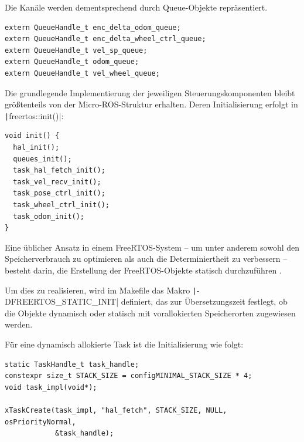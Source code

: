 Die Kanäle werden dementsprechend durch Queue-Objekte repräsentiert.

\begin{code}
\begin{verbatim}
extern QueueHandle_t enc_delta_odom_queue;
extern QueueHandle_t enc_delta_wheel_ctrl_queue;
extern QueueHandle_t vel_sp_queue;
extern QueueHandle_t odom_queue;
extern QueueHandle_t vel_wheel_queue;
\end{verbatim}
\end{code}

Die grundlegende Implementierung der jeweiligen Steuerungskomponenten bleibt
größtenteils von der Micro-ROS-Struktur erhalten. Deren Initialisierung erfolgt
in \texttt|freertos::init()|:

\begin{code}
\begin{verbatim}
void init() {
  hal_init();
  queues_init();
  task_hal_fetch_init();
  task_vel_recv_init();
  task_pose_ctrl_init();
  task_wheel_ctrl_init();
  task_odom_init();
}
\end{verbatim}
\end{code}

Eine üblicher Ansatz in einem FreeRTOS-System -- um unter anderem sowohl den
Speicherverbrauch zu optimieren als auch die Determiniertheit zu verbessern --
besteht darin, die Erstellung der FreeRTOS-Objekte statisch durchzuführen
\cite{freertos_memory_management}.

Um dies zu realisieren, wird im Makefile das Makro
\texttt|-DFREERTOS_STATIC_INIT| definiert, das zur Übersetzungszeit
festlegt, ob die Objekte dynamisch oder statisch mit vorallokierten
Speicherorten zugewiesen werden.

Für eine dynamisch allokierte Task ist die Initialisierung wie folgt:

\begin{code}
\begin{verbatim}
static TaskHandle_t task_handle;
constexpr size_t STACK_SIZE = configMINIMAL_STACK_SIZE * 4;
void task_impl(void*);

xTaskCreate(task_impl, "hal_fetch", STACK_SIZE, NULL, osPriorityNormal,
            &task_handle);
\end{verbatim}
\end{code}

